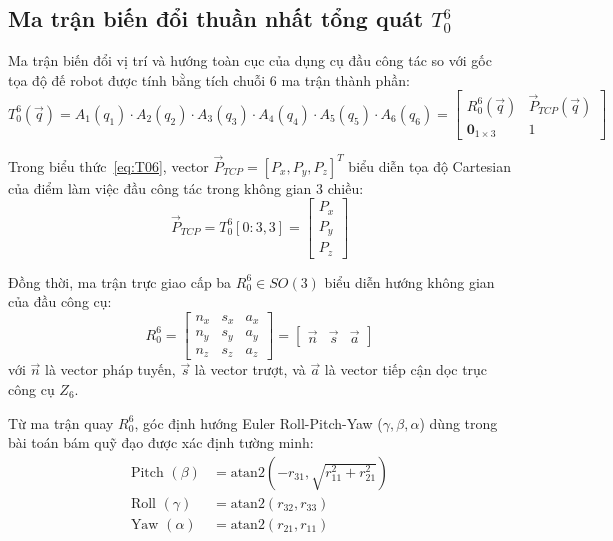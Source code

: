 \subsection{Ma trận biến đổi thuần nhất tổng quát $T_0^6$}

Ma trận biến đổi vị trí và hướng toàn cục của dụng cụ đầu công tác so với gốc tọa độ đế robot được tính bằng tích chuỗi 6 ma trận thành phần:
\begin{equation}
    T_0^6(\vec{q}) = A_1(q_1) \cdot A_2(q_2) \cdot A_3(q_3) \cdot A_4(q_4) \cdot A_5(q_5) \cdot A_6(q_6) = \begin{bmatrix}
        R_0^6(\vec{q}) & \vec{P}_{TCP}(\vec{q}) \\
        \mathbf{0}_{1 \times 3} & 1
    \end{bmatrix}
    \label{eq:T06}
\end{equation}

Trong biểu thức~\eqref{eq:T06}, vector $\vec{P}_{TCP} = [P_x, P_y, P_z]^T$ biểu diễn tọa độ Cartesian của điểm làm việc đầu công tác trong không gian 3 chiều:
\begin{equation}
    \vec{P}_{TCP} = T_0^6[0:3, 3] = \begin{bmatrix} P_x \\ P_y \\ P_z \end{bmatrix}
\end{equation}

Đồng thời, ma trận trực giao cấp ba $R_0^6 \in SO(3)$ biểu diễn hướng không gian của đầu công cụ:
\begin{equation}
    R_0^6 = \begin{bmatrix}
        n_x & s_x & a_x \\
        n_y & s_y & a_y \\
        n_z & s_z & a_z
    \end{bmatrix} = \begin{bmatrix} \vec{n} & \vec{s} & \vec{a} \end{bmatrix}
\end{equation}
với $\vec{n}$ là vector pháp tuyến, $\vec{s}$ là vector trượt, và $\vec{a}$ là vector tiếp cận dọc trục công cụ $Z_6$.

Từ ma trận quay $R_0^6$, góc định hướng Euler Roll-Pitch-Yaw ($\gamma, \beta, \alpha$) dùng trong bài toán bám quỹ đạo được xác định tường minh:
\begin{align}
    \text{Pitch } (\beta) &= \text{atan2}\left(-r_{31}, \sqrt{r_{11}^2 + r_{21}^2}\right) \\
    \text{Roll } (\gamma)  &= \text{atan2}(r_{32}, r_{33}) \\
    \text{Yaw } (\alpha)  &= \text{atan2}(r_{21}, r_{11})
\end{align}

